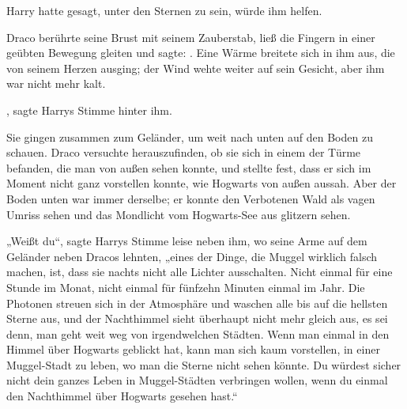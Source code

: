 Harry hatte gesagt, unter den Sternen zu sein, würde ihm helfen.

Draco berührte seine Brust mit seinem Zauberstab, ließ die Fingern in einer geübten Bewegung gleiten und sagte: . Eine Wärme breitete sich in ihm aus, die von seinem Herzen ausging; der Wind wehte weiter auf sein Gesicht, aber ihm war nicht mehr kalt.

, sagte Harrys Stimme hinter ihm.

Sie gingen zusammen zum Geländer, um weit nach unten auf den Boden zu schauen. Draco versuchte herauszufinden, ob sie sich in einem der Türme befanden, die man von außen sehen konnte, und stellte fest, dass er sich im Moment nicht ganz vorstellen konnte, wie Hogwarts von außen aussah. Aber der Boden unten war immer derselbe; er konnte den Verbotenen Wald als vagen Umriss sehen und das Mondlicht vom Hogwarts-See aus glitzern sehen.

„Weißt du“, sagte Harrys Stimme leise neben ihm, wo seine Arme auf dem Geländer neben Dracos lehnten, „eines der Dinge, die Muggel wirklich falsch machen, ist, dass sie nachts nicht alle Lichter ausschalten. Nicht einmal für eine Stunde im Monat, nicht einmal für fünfzehn Minuten einmal im Jahr. Die Photonen streuen sich in der Atmosphäre und waschen alle bis auf die hellsten Sterne aus, und der Nachthimmel sieht überhaupt nicht mehr gleich aus, es sei denn, man geht weit weg von irgendwelchen Städten. Wenn man einmal in den Himmel über Hogwarts geblickt hat, kann man sich kaum vorstellen, in einer Muggel-Stadt zu leben, wo man die Sterne nicht sehen könnte. Du würdest sicher nicht dein ganzes Leben in Muggel-Städten verbringen wollen, wenn du einmal den Nachthimmel über Hogwarts gesehen hast.“

